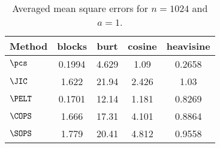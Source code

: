 \begin{table}[ht]
\centering
\begin{tabular}{lcccc}
  \hline
Method & blocks & burt & cosine & heavisine \\ 
  \hline
$\pcs$ & 0.1994 & 4.629 &  1.09 & 0.2658 \\ 
  $\JIC$ & 1.622 & 21.94 & 2.426 &  1.03 \\ 
  $\PELT$ & 0.1701 & 12.14 & 1.181 & 0.8269 \\ 
  $\COPS$ & 1.666 & 17.31 & 4.101 & 0.8864 \\ 
  $\SOPS$ & 1.779 & 20.41 & 4.812 & 0.9558 \\ 
   \hline
\end{tabular}
\caption{Averaged mean square errors for $n = 1024$ and $a = 1$.} 
\label{tab:aMSEn1024a1}
\end{table}
